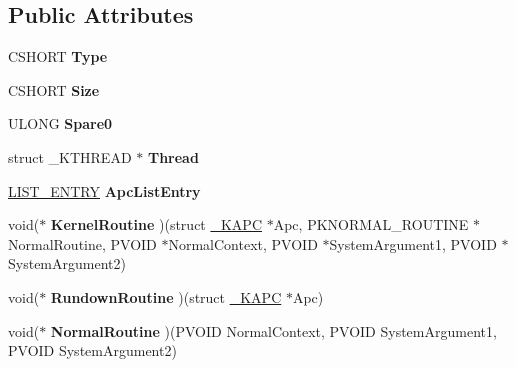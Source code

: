 \subsection*{Public Attributes}
\begin{DoxyCompactItemize}
\item 
\hypertarget{struct__KAPC_afded0709763f80935acf199c518d05db}{}C\+S\+H\+O\+R\+T {\bfseries Type}\label{struct__KAPC_afded0709763f80935acf199c518d05db}

\item 
\hypertarget{struct__KAPC_ae665df28d7ae3566805521dc6a261cfc}{}C\+S\+H\+O\+R\+T {\bfseries Size}\label{struct__KAPC_ae665df28d7ae3566805521dc6a261cfc}

\item 
\hypertarget{struct__KAPC_a27b5bd9d17738fd15690ffcb88352276}{}U\+L\+O\+N\+G {\bfseries Spare0}\label{struct__KAPC_a27b5bd9d17738fd15690ffcb88352276}

\item 
\hypertarget{struct__KAPC_a1c9a19a1ea228a1223e9b8e8ac35fc36}{}struct \+\_\+\+K\+T\+H\+R\+E\+A\+D $\ast$ {\bfseries Thread}\label{struct__KAPC_a1c9a19a1ea228a1223e9b8e8ac35fc36}

\item 
\hypertarget{struct__KAPC_a56e6f75ddbe45e35bc920edc87efecf7}{}\hyperlink{struct__LIST__ENTRY}{L\+I\+S\+T\+\_\+\+E\+N\+T\+R\+Y} {\bfseries Apc\+List\+Entry}\label{struct__KAPC_a56e6f75ddbe45e35bc920edc87efecf7}

\item 
\hypertarget{struct__KAPC_adcb9073b80c12229740c77ffdb7be786}{}void($\ast$ {\bfseries Kernel\+Routine} )(struct \hyperlink{struct__KAPC}{\+\_\+\+K\+A\+P\+C} $\ast$Apc, P\+K\+N\+O\+R\+M\+A\+L\+\_\+\+R\+O\+U\+T\+I\+N\+E $\ast$Normal\+Routine, P\+V\+O\+I\+D $\ast$Normal\+Context, P\+V\+O\+I\+D $\ast$System\+Argument1, P\+V\+O\+I\+D $\ast$System\+Argument2)\label{struct__KAPC_adcb9073b80c12229740c77ffdb7be786}

\item 
\hypertarget{struct__KAPC_a5db58e1177550e0ae1305f75729b66df}{}void($\ast$ {\bfseries Rundown\+Routine} )(struct \hyperlink{struct__KAPC}{\+\_\+\+K\+A\+P\+C} $\ast$Apc)\label{struct__KAPC_a5db58e1177550e0ae1305f75729b66df}

\item 
\hypertarget{struct__KAPC_a9a479477775c9fb31f91b83cfbb8a2d1}{}void($\ast$ {\bfseries Normal\+Routine} )(P\+V\+O\+I\+D Normal\+Context, P\+V\+O\+I\+D System\+Argument1, P\+V\+O\+I\+D System\+Argument2)\label{struct__KAPC_a9a479477775c9fb31f91b83cfbb8a2d1}


\end{DoxyCompactItemize}

